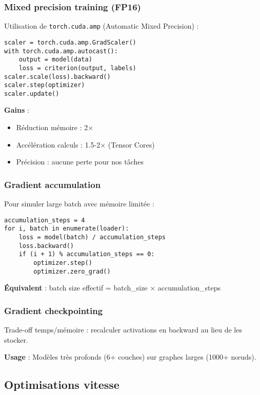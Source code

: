 \subsubsection{Mixed precision training (FP16)}

Utilisation de \texttt{torch.cuda.amp} (Automatic Mixed Precision) :
\begin{verbatim}
scaler = torch.cuda.amp.GradScaler()
with torch.cuda.amp.autocast():
    output = model(data)
    loss = criterion(output, labels)
scaler.scale(loss).backward()
scaler.step(optimizer)
scaler.update()
\end{verbatim}

\textbf{Gains} :
\begin{itemize}
    \item Réduction mémoire : 2×
    \item Accélération calculs : 1.5-2× (Tensor Cores)
    \item Précision : aucune perte pour nos tâches
\end{itemize}

\subsubsection{Gradient accumulation}

Pour simuler large batch avec mémoire limitée :
\begin{verbatim}
accumulation_steps = 4
for i, batch in enumerate(loader):
    loss = model(batch) / accumulation_steps
    loss.backward()
    if (i + 1) % accumulation_steps == 0:
        optimizer.step()
        optimizer.zero_grad()
\end{verbatim}

\textbf{Équivalent} : batch size effectif = batch\_size × accumulation\_steps

\subsubsection{Gradient checkpointing}

Trade-off temps/mémoire : recalculer activations en backward au lieu de les stocker.

\textbf{Usage} : Modèles très profonds (6+ couches) sur graphes larges (1000+ nœuds).

\subsection{Optimisations vitesse}


